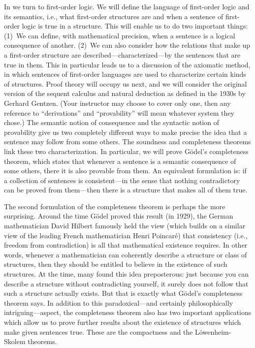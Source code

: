 In  we turn to first-order logic. We will define the
language of first-order logic and its semantics, i.e., what
first-order structures are and when a sentence of first-order logic is
true in a structure. This will enable us to do two important things:
(1)~We can define, with mathematical precision, when a sentence is a
logical consequence of another. (2)~We can also consider how the
relations that make up a first-order structure are
described---characterized---by the sentences that are true in them.
This in particular leads us to a discussion of the axiomatic method,
in which sentences of first-order languages are used to characterize
certain kinds of structures. Proof theory will occupy us next, and we
will consider the original version of the sequent calculus and natural
deduction as defined in the 1930s by Gerhard Gentzen. (Your instructor
may choose to cover only one, then any reference to ``derivations''
and ``provability'' will mean whatever system they chose.) The
semantic notion of consequence and the syntactic notion of provability
give us two completely different ways to make precise the idea that a
sentence may follow from some others. The soundness and completeness
theorems link these two characterization. In particular, we will prove
G\"odel's completeness theorem, which states that whenever a sentence
is a semantic consequence of some others, there it is also provable
from them. An equivalent formulation is: if a collection of sentences
is consistent---in the sense that nothing contradictory can be proved
from them---then there is a structure that makes all of them true.

The second formulation of the completeness theorem is perhaps the more
surprising. Around the time G\"odel proved this result (in 1929), the
German mathematician David Hilbert famously held the view (which builds on a similar view of the leading French mathematician Henri Poincar\'e) that
consistency (i.e., freedom from contradiction) is all that mathematical
existence requires. In other words, whenever a mathematician can
coherently describe a structure or class of structures, then they
should be entitled to believe in the existence of such structures.
At the time, many found this idea preposterous: just because you can
describe a structure without contradicting yourself, it surely does
not follow that such a structure actually exists. But that is exactly
what G\"odel's completeness theorem says. In addition to this
paradoxical---and certainly philosophically intriguing---aspect, the
completeness theorem also has two important applications which allow
us to prove further results about the existence of structures which
make given sentences true. These are the compactness and the
L\"owenheim-Skolem theorems.

